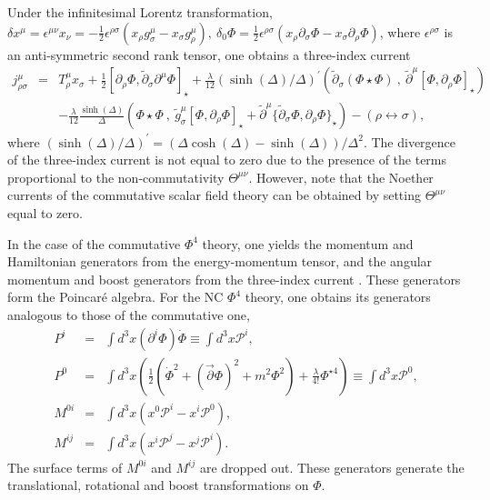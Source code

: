 \documentclass[a4paper,a4paper]{article}
\begin{document}
Under the infinitesimal Lorentz transformation, 
$\delta x^\mu = \epsilon^{\mu\nu}x_\nu = 
-\frac 12\epsilon^{\rho\sigma}(x_\rho g_\sigma^\mu-x_\sigma g_\rho^\mu),~
\delta_0 \Phi= 
\frac 12\epsilon^{\rho\sigma}(x_\rho\partial_\sigma\Phi-x_\sigma \partial_\rho \Phi)$, 
where $\epsilon^{\rho\sigma}$ is an anti-symmetric second rank tensor, 
one obtains a three-index current
\begin{eqnarray}
j_{\rho\sigma}^\mu & = & T_\rho^\mu x_\sigma 
+\frac 12[\partial_\rho\Phi,\tilde{\partial}_\sigma\partial^\mu\Phi]_\star 
+\frac{\lambda}{12}(\sinh(\Delta)/\Delta)^\prime
(\tilde{\partial}_\sigma(\Phi\star\Phi)~,
~\tilde{\partial}^\mu[\Phi,\partial_\rho\Phi]_\star) \nonumber\\
&  & -\frac{\lambda}{12}\frac{\sinh(\Delta)}{\Delta}
(\Phi\star\Phi~,~\tilde{g}_\sigma^\mu[\Phi,\partial_\rho\Phi]_\star+
\tilde{\partial}^\mu\{\tilde{\partial}_\sigma\Phi,\partial_\rho\Phi\}_\star)
-(\rho\leftrightarrow\sigma), 
\label{three-index current}
\end{eqnarray}
where $(\sinh(\Delta)/\Delta)^\prime=(\Delta \cosh(\Delta)-\sinh(\Delta))/\Delta^2$.
The divergence of the three-index current is not equal to zero due to the presence of the 
terms proportional to the non-commutativity $\Theta^{\mu\nu}$. However, note that the Noether currents of the 
commutative scalar field theory can be obtained by setting $\Theta^{\mu\nu}$ equal to zero. 

In the case of the commutative $\Phi^4$ theory, one yields 
the momentum and Hamiltonian generators 
from the energy-momentum tensor, and the angular momentum and boost generators 
from the three-index current 
\cite{Ramond}. These generators form the Poincar\'{e} algebra. For the NC 
$\Phi^4$ theory, one obtains its generators analogous to those of the commutative one,
\begin{eqnarray}
P^i & = & \int d^3x (\partial^i\Phi)\dot{\Phi} \equiv \int d^3x \mathcal{P}^i, \\
P^0 & = & \int d^3x \left(\frac 12(\dot{\Phi}^2+(\vec{\partial}\Phi)^2+m^2\Phi^2) 
+\frac{\lambda}{4!}\Phi^{\star 4}\right) \equiv \int d^3x \mathcal{P}^0,\\
M^{0i} & = & \int d^3x(x^0\mathcal{P}^i-x^i\mathcal{P}^0),\\
M^{ij} & = & \int d^3x(x^i\mathcal{P}^j-x^j\mathcal{P}^i).
\end{eqnarray}
The surface terms of $M^{0i}$ and $M^{ij}$ are dropped out. These generators generate 
the translational, rotational and boost transformations on $\Phi$. 
\end{document}
